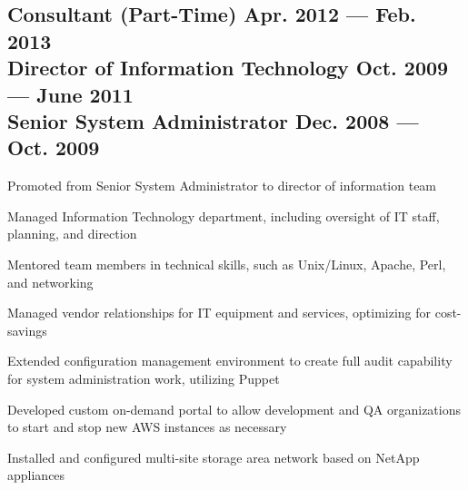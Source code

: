 \documentclass[letter,10pt]{article}
\begin{document}
\subsection{Consultant (Part-Time) \hfill Apr. 2012 --- Feb.  2013\\
	Director of Information Technology \hfill Oct. 2009 --- June 2011\\
	Senior System Administrator \hfill Dec. 2008 --- Oct. 2009}
\begin{zitemize}
	\item Promoted from Senior System Administrator to director of
	information team
	\item Managed Information Technology department, including
	oversight of IT staff, planning, and direction
	\item Mentored team members in technical skills, such as
	Unix/Linux, Apache, Perl, and networking
	\item Managed vendor relationships for IT equipment and
	services, optimizing for cost-savings
	\item Extended configuration management environment to create
	full audit capability for system administration work,
	utilizing Puppet
	\item Developed custom on-demand portal to allow development and
	QA organizations to start and stop new AWS instances as
	necessary
	\item Installed and configured multi-site storage area network
	based on NetApp appliances
\end{zitemize}

\end{document}
